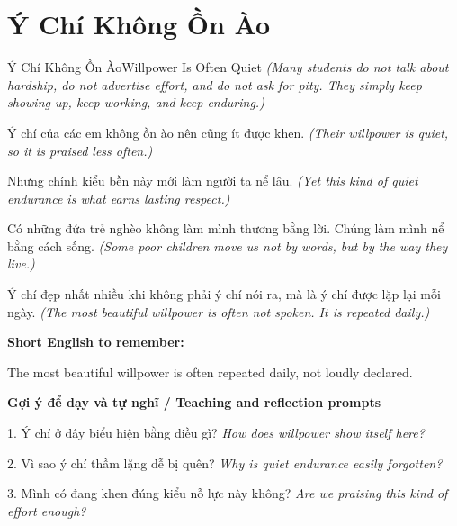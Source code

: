 \section{Ý Chí Không Ồn Ào}
\begin{truyen}{Ý Chí Không Ồn Ào}{Willpower Is Often Quiet}
\textit{(Many students do not talk about hardship, do not advertise effort, and do not ask for pity. They simply keep showing up, keep working, and keep enduring.)}

Ý chí của các em không ồn ào nên cũng ít được khen.
\textit{(Their willpower is quiet, so it is praised less often.)}

Nhưng chính kiểu bền này mới làm người ta nể lâu.
\textit{(Yet this kind of quiet endurance is what earns lasting respect.)}

Có những đứa trẻ nghèo không làm mình thương bằng lời. Chúng làm mình nể bằng cách sống.
\textit{(Some poor children move us not by words, but by the way they live.)}

\end{truyen}

\begin{baihoc}
Ý chí đẹp nhất nhiều khi không phải ý chí nói ra, mà là ý chí được lặp lại mỗi ngày.
\textit{(The most beautiful willpower is often not spoken. It is repeated daily.)}
\end{baihoc}

\begin{ghinhoanh}
\textbf{Short English to remember:}

The most beautiful willpower is often repeated daily, not loudly declared.

\end{ghinhoanh}

\begin{tuhocnhanh}
\textbf{Gợi ý để dạy và tự nghĩ / Teaching and reflection prompts}

1. Ý chí ở đây biểu hiện bằng điều gì? \textit{How does willpower show itself here?}

2. Vì sao ý chí thầm lặng dễ bị quên? \textit{Why is quiet endurance easily forgotten?}

3. Mình có đang khen đúng kiểu nỗ lực này không? \textit{Are we praising this kind of effort enough?}
\end{tuhocnhanh}
